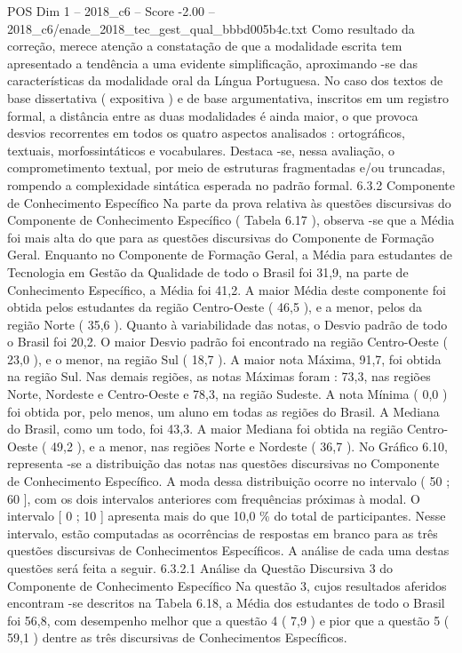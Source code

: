 \begin{textsample}{POS Dim 1 – 2018\_c6 – Score -2.00 – 2018\_c6/enade\_2018\_tec\_gest\_qual\_bbbd005b4c.txt}
Como resultado da correção, merece atenção a constatação de que a modalidade escrita tem apresentado a tendência a uma evidente simplificação, aproximando -se das características da modalidade oral da Língua Portuguesa.
No caso dos textos de base dissertativa ( expositiva ) e de base argumentativa, inscritos em um registro formal, a distância entre as duas modalidades é ainda maior, o que provoca desvios recorrentes em todos os quatro aspectos analisados : ortográficos, textuais, morfossintáticos e vocabulares.
Destaca -se, nessa avaliação, o comprometimento textual, por meio de estruturas fragmentadas e/ou truncadas, rompendo a complexidade sintática esperada no padrão formal. 6.3.2 Componente de Conhecimento Específico Na parte da prova relativa às questões discursivas do Componente de Conhecimento Específico ( Tabela 6.17 ), observa -se que a Média foi mais alta do que para as questões discursivas do Componente de Formação Geral.
Enquanto no Componente de Formação Geral, a Média para estudantes de Tecnologia em Gestão da Qualidade de todo o Brasil foi 31,9, na parte de Conhecimento Específico, a Média foi 41,2.
A maior Média deste componente foi obtida pelos estudantes da região Centro-Oeste ( 46,5 ), e a menor, pelos da região Norte ( 35,6 ).
Quanto à variabilidade das notas, o Desvio padrão de todo o Brasil foi 20,2.
O maior Desvio padrão foi encontrado na região Centro-Oeste ( 23,0 ), e o menor, na região Sul ( 18,7 ).
A maior nota Máxima, 91,7, foi obtida na região Sul.
Nas demais regiões, as notas Máximas foram : 73,3, nas regiões Norte, Nordeste e Centro-Oeste e 78,3, na região Sudeste.
A nota Mínima ( 0,0 ) foi obtida por, pelo menos, um aluno em todas as regiões do Brasil.
A Mediana do Brasil, como um todo, foi 43,3.
A maior Mediana foi obtida na região Centro-Oeste ( 49,2 ), e a menor, nas regiões Norte e Nordeste ( 36,7 ).
No Gráfico 6.10, representa -se a distribuição das notas nas questões discursivas no Componente de Conhecimento Específico.
A moda dessa distribuição ocorre no intervalo ( 50 ; 60 ], com os dois intervalos anteriores com frequências próximas à modal.
O intervalo [ 0 ; 10 ] apresenta mais do que 10,0 \% do total de participantes.
Nesse intervalo, estão computadas as ocorrências de respostas em branco para as três questões discursivas de Conhecimentos Específicos.
A análise de cada uma destas questões será feita a seguir. 6.3.2.1 Análise da Questão Discursiva 3 do Componente de Conhecimento Específico Na questão 3, cujos resultados aferidos encontram -se descritos na Tabela 6.18, a Média dos estudantes de todo o Brasil foi 56,8, com desempenho melhor que a questão 4 ( 7,9 ) e pior que a questão 5 ( 59,1 ) dentre as três discursivas de Conhecimentos Específicos.

\end{textsample}
